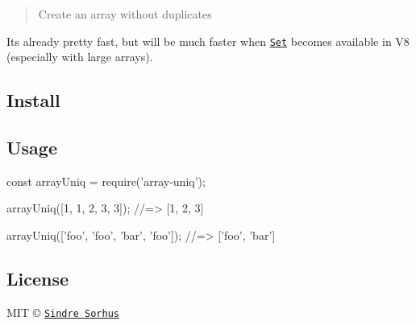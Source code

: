 \begin{quote}
Create an array without duplicates \end{quote}


It\textquotesingle{}s already pretty fast, but will be much faster when \href{https://developer.mozilla.org/en-US/docs/Web/JavaScript/Reference/Global_Objects/Set}{\tt Set} becomes available in V8 (especially with large arrays).

\subsection*{Install}




\subsection*{Usage}


\begin{DoxyCode}
const arrayUniq = require('array-uniq');

arrayUniq([1, 1, 2, 3, 3]);
//=> [1, 2, 3]

arrayUniq(['foo', 'foo', 'bar', 'foo']);
//=> ['foo', 'bar']
\end{DoxyCode}


\subsection*{License}

M\+IT © \href{https://sindresorhus.com}{\tt Sindre Sorhus} 